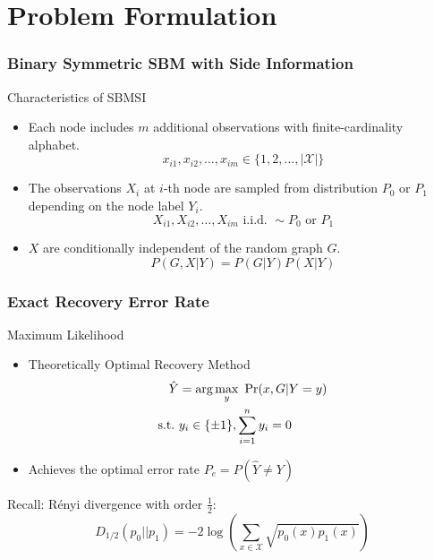\documentclass{beamer}
\begin{document}
\section{Problem Formulation}
\begin{frame}
\frametitle{Binary Symmetric SBM with Side Information}
\begin{block}{Characteristics of SBMSI}
\begin{itemize}
	\item   Each node includes $m$ additional observations with
	finite-cardinality alphabet.
	\begin{equation*}
		x_{i1}, x_{i2}, \dots, x_{im} \in \{1, 2, \dots, |\mathcal{X}|\}
	\end{equation*}
	\item The observations $X_i$ at $i$-th node are sampled from distribution $P_0$
	or $P_1$ depending on the node label $Y_i$.
	\begin{equation*}
		X_{i1}, X_{i2}, \dots, X_{im} \textrm{ i.i.d. } \sim P_0 \textrm{ or } P_1
	\end{equation*}
	\item $X$ are conditionally independent of the random
	graph $G$.
	\begin{equation*}
		P(G, X | Y) = P(G | Y) P(X | Y)
	\end{equation*}
\end{itemize}
\end{block}

\end{frame}
\begin{frame}\frametitle{Exact Recovery Error Rate}
\begin{block}{Maximum Likelihood}
\begin{itemize}
	\item Theoretically Optimal Recovery Method
	\begin{align*}
		\hat{Y} &= \arg\max_y\ \Pr(x,G|Y=y) \notag \\
		\textrm{s.t.} \ & y_i \in \{\pm 1\}, \sum_{i=1}^n y_i=0 \label{eq:mle}
	\end{align*}
	\item Achieves the optimal error rate $P_e=P(\hat{Y} \neq Y)$
\end{itemize}
\end{block}
Recall: Rényi divergence with order $\frac{1}{2}$:
\begin{equation*}
	D_{1/2}(p_0 || p_1) = -2\log(\sum_{x \in \mathcal{X}} \sqrt{p_0(x)p_1(x)} )
\end{equation*}
\end{frame}
\end{document}
